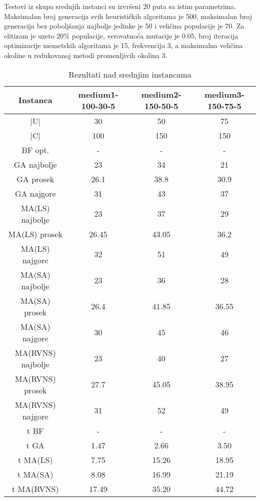 \documentclass[12pt, a4paper]{article}
\theoremstyle{definition}
\begin{document}
Testovi iz skupa srednjih instanci su izvršeni 20 puta sa istim parametrima. Maksimalan broj generacija svih heurističkih algoritama je 500, maksimalan broj generacija bez poboljšanja najbolje jedinke je 50 i veličina populacije je 70. Za elitizam je uzeto 20\% populacije, verovatnoća mutacije je 0.05, broj iteracija optimizacije memetskih algoritama je 15, frekvencija 3, a maksimalna veličina okoline u redukovanoj metodi promenljivih okolina 3.

\begin{table}[H]
\label{tab:2}
\begin{adjustbox}{width=\columnwidth,center}
\begin{tabular}{ |c|c|c|c| }
\hline
Instanca & medium1-100-30-5 & medium2-150-50-5 & medium3-150-75-5 \\
\hline
|U| & 30 & 50 & 75 \\
\hline
|C| & 100 & 150 & 150 \\
\hline
BF opt. & - & - & - \\
\hline
GA najbolje & 23 & 34 & 21 \\
\hline
GA prosek & 26.1 & 38.8 & 30.9 \\
\hline
GA najgore & 31 & 43 & 37 \\
\hline
MA(LS) najbolje & 23 & 37 & 29 \\
\hline
MA(LS) prosek & 26.45 & 43.05 & 36.2 \\
\hline
MA(LS) najgore & 32 & 51 & 49 \\
\hline
MA(SA) najbolje & 23 & 36 & 28 \\
\hline
MA(SA) prosek & 26.4 & 41.85 & 36.55 \\
\hline
MA(SA) najgore & 30 & 45 & 46 \\
\hline
MA(RVNS) najbolje & 23 & 40 & 27 \\
\hline
MA(RVNS) prosek & 27.7 & 45.05 & 38.95 \\
\hline
MA(RVNS) najgore & 31 & 52 & 49 \\
\hline
t BF & - & - & - \\
\hline
t GA & 1.47 & 2.66 & 3.50 \\
\hline
t MA(LS) & 7.75 & 15.26 & 18.95 \\
\hline
t MA(SA) & 8.08 & 16.99 & 21.19 \\
\hline
t MA(RVNS) & 17.49 & 35.20 & 44.72 \\
\hline
\end{tabular}
\end{adjustbox}
\caption{Rezultati nad srednjim instancama}
\end{table}
\end{document}
